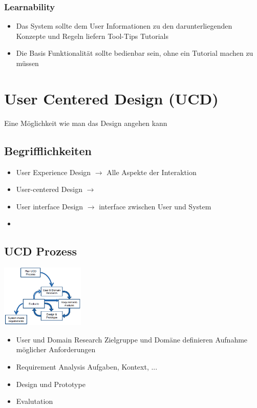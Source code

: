 \documentclass{report}
\newenvironment{Figure}
	{\par\medskip\noindent\minipage{\linewidth}}
	{\endminipage\par\medskip}
\theoremstyle{definition}
\theoremstyle{example}
\begin{document}
\subsubsection{Learnability}
\begin{itemize}
   \item Das System sollte dem User Informationen zu den darunterliegenden Konzepte und Regeln liefern
   \subitem Tool-Tips
   \subitem Tutorials
   \item Die Basis Funktionalität sollte bedienbar sein, ohne ein Tutorial machen zu müssen
\end{itemize}

\section*{User Centered Design (UCD)}
Eine Möglichkeit wie man das Design angehen kann

\subsection{Begrifflichkeiten}
\begin{itemize}
   \item User Experience Design $\rightarrow$ Alle Aspekte der Interaktion
   \item User-centered Design $\rightarrow$ 
   \item User interface Design $\rightarrow$ interface zwischen User und System
   \item 
\end{itemize}

\subsection{UCD Prozess}
\begin{Figure}
   \centering
    \includegraphics[width=150px]{img/UCD Process.png}
        \label{fig:UCD Process}
\end{Figure}
\begin{itemize}
   \item User und Domain Research
   \subitem Zielgruppe und Domäne definieren
   \subitem Aufnahme möglicher Anforderungen
   \item Requirement Analysis
   \subitem Aufgaben, Kontext, ...
   \item Design und Prototype
   \item Evalutation
\end{itemize}
\end{document}
